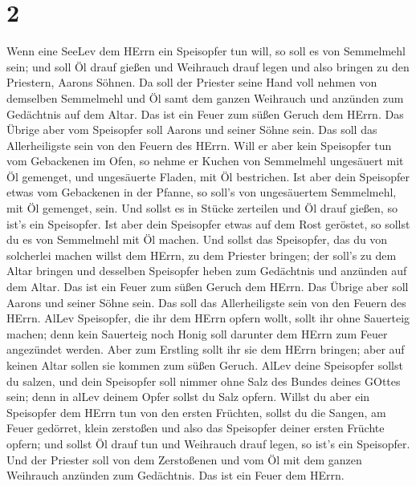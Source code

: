 \hypertarget{section-1}{%
\section{2}\label{section-1}}

 Wenn eine SeeLev dem HErrn ein Speisopfer tun will, so soll
es von Semmelmehl sein; und soll Öl drauf gießen und Weihrauch drauf
legen  und also bringen zu den Priestern, Aarons Söhnen. Da
soll der Priester seine Hand voll nehmen von demselben Semmelmehl und Öl
samt dem ganzen Weihrauch und anzünden zum Gedächtnis auf dem Altar. Das
ist ein Feuer zum süßen Geruch dem HErrn.  Das Übrige aber
vom Speisopfer soll Aarons und seiner Söhne sein. Das soll das
Allerheiligste sein von den Feuern des HErrn.  Will er aber
kein Speisopfer tun vom Gebackenen im Ofen, so nehme er Kuchen von
Semmelmehl ungesäuert mit Öl gemenget, und ungesäuerte Fladen, mit Öl
bestrichen.  Ist aber dein Speisopfer etwas vom Gebackenen
in der Pfanne, so soll's von ungesäuertem Semmelmehl, mit Öl gemenget,
sein.  Und sollst es in Stücke zerteilen und Öl drauf
gießen, so ist's ein Speisopfer.  Ist aber dein Speisopfer
etwas auf dem Rost geröstet, so sollst du es von Semmelmehl mit Öl
machen.  Und sollst das Speisopfer, das du von solcherlei
machen willst dem HErrn, zu dem Priester bringen; der soll's zu dem
Altar bringen  und desselben Speisopfer heben zum Gedächtnis
und anzünden auf dem Altar. Das ist ein Feuer zum süßen Geruch dem
HErrn.  Das Übrige aber soll Aarons und seiner Söhne sein.
Das soll das Allerheiligste sein von den Feuern des HErrn. 
AlLev Speisopfer, die ihr dem HErrn opfern wollt, sollt ihr ohne
Sauerteig machen; denn kein Sauerteig noch Honig soll darunter dem HErrn
zum Feuer angezündet werden.  Aber zum Erstling sollt ihr
sie dem HErrn bringen; aber auf keinen Altar sollen sie kommen zum süßen
Geruch.  AlLev deine Speisopfer sollst du salzen, und dein
Speisopfer soll nimmer ohne Salz des Bundes deines GOttes sein; denn in
alLev deinem Opfer sollst du Salz opfern.  Willst du aber
ein Speisopfer dem HErrn tun von den ersten Früchten, sollst du die
Sangen, am Feuer gedörret, klein zerstoßen und also das Speisopfer
deiner ersten Früchte opfern;  und sollst Öl drauf tun und
Weihrauch drauf legen, so ist's ein Speisopfer.  Und der
Priester soll von dem Zerstoßenen und vom Öl mit dem ganzen Weihrauch
anzünden zum Gedächtnis. Das ist ein Feuer dem HErrn.

